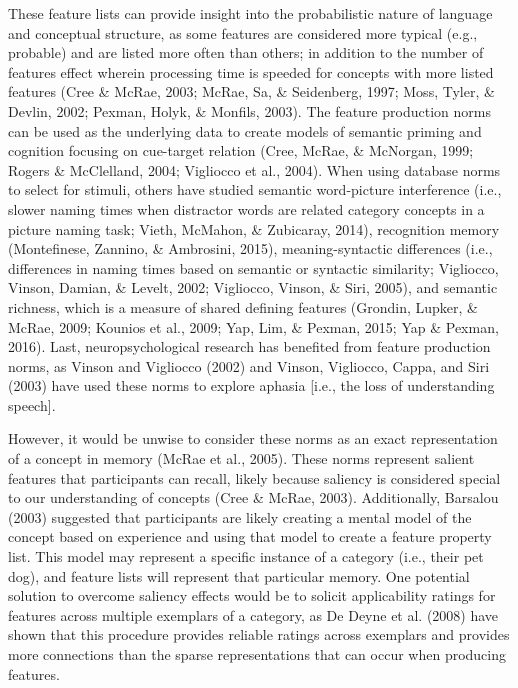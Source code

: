 \documentclass[english,,man]{apa6}
\begin{document}
These feature lists can provide insight into the probabilistic nature of language and conceptual structure, as some features are considered more typical (e.g., probable) and are listed more often than others; in addition to the number of features effect wherein processing time is speeded for concepts with more listed features (Cree \& McRae, 2003; McRae, Sa, \& Seidenberg, 1997; Moss, Tyler, \& Devlin, 2002; Pexman, Holyk, \& Monfils, 2003). The feature production norms can be used as the underlying data to create models of semantic priming and cognition focusing on cue-target relation (Cree, McRae, \& McNorgan, 1999; Rogers \& McClelland, 2004; Vigliocco et al., 2004). When using database norms to select for stimuli, others have studied semantic word-picture interference (i.e., slower naming times when distractor words are related category concepts in a picture naming task; Vieth, McMahon, \& Zubicaray, 2014), recognition memory (Montefinese, Zannino, \& Ambrosini, 2015), meaning-syntactic differences (i.e., differences in naming times based on semantic or syntactic similarity; Vigliocco, Vinson, Damian, \& Levelt, 2002; Vigliocco, Vinson, \& Siri, 2005), and semantic richness, which is a measure of shared defining features (Grondin, Lupker, \& McRae, 2009; Kounios et al., 2009; Yap, Lim, \& Pexman, 2015; Yap \& Pexman, 2016). Last, neuropsychological research has benefited from feature production norms, as Vinson and Vigliocco (2002) and Vinson, Vigliocco, Cappa, and Siri (2003) have used these norms to explore aphasia {[}i.e., the loss of understanding speech{]}.

However, it would be unwise to consider these norms as an exact representation of a concept in memory (McRae et al., 2005). These norms represent salient features that participants can recall, likely because saliency is considered special to our understanding of concepts (Cree \& McRae, 2003). Additionally, Barsalou (2003) suggested that participants are likely creating a mental model of the concept based on experience and using that model to create a feature property list. This model may represent a specific instance of a category (i.e., their pet dog), and feature lists will represent that particular memory. One potential solution to overcome saliency effects would be to solicit applicability ratings for features across multiple exemplars of a category, as De Deyne et al. (2008) have shown that this procedure provides reliable ratings across exemplars and provides more connections than the sparse representations that can occur when producing features.
\end{document}
